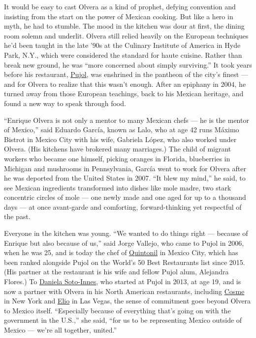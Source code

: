It would be easy to cast Olvera as a kind of prophet, defying convention
and insisting from the start on the power of Mexican cooking. But like a
hero in myth, he had to stumble. The mood in the kitchen was dour at
first, the dining room solemn and underlit. Olvera still relied heavily
on the European techniques he'd been taught in the late '90s at the
Culinary Institute of America in Hyde Park, N.Y., which were considered
the standard for haute cuisine. Rather than break new ground, he was
``more concerned about simply surviving.'' It took years before his
restaurant, \href{https://pujol.com.mx/en/}{Pujol}, was enshrined in the
pantheon of the city's finest --- and for Olvera to realize that this
wasn't enough. After an epiphany in 2004, he turned away from those
European teachings, back to his Mexican heritage, and found a new way to
speak through food.

``Enrique Olvera is not only a mentor to many Mexican chefs --- he is
the mentor of Mexico,'' said Eduardo García, known as Lalo, who at age
42 runs Máximo Bistrot in Mexico City with his wife, Gabriela López, who
also worked under Olvera. (His kitchens have brokered many marriages.)
The child of migrant workers who became one himself, picking oranges in
Florida, blueberries in Michigan and mushrooms in Pennsylvania, García
went to work for Olvera after he was deported from the United States in
2007. ``It blew my mind,'' he said, to see Mexican ingredients
transformed into dishes like mole madre, two stark concentric circles of
mole --- one newly made and one aged for up to a thousand days --- at
once avant-garde and comforting, forward-thinking yet respectful of the
past.

Everyone in the kitchen was young. ``We wanted to do things right ---
because of Enrique but also because of us,'' said Jorge Vallejo, who
came to Pujol in 2006, when he was 25, and is today the chef of
\href{https://quintonil.com/en/restaurant-quintonil/}{Quintonil} in
Mexico City, which has been ranked alongside Pujol on the World's 50
Best Restaurants list since 2015. (His partner at the restaurant is his
wife and fellow Pujol alum, Alejandra Flores.) To
\href{https://www.nytimes.com/2019/01/02/t-magazine/daniela-soto-innes-recipes-wellness.html}{Daniela
Soto-Innes}, who started at Pujol in 2013, at age 19, and is now a
partner with Olvera in his North American restaurants, including
\href{https://www.cosmenyc.com/}{Cosme} in New York and
\href{https://eliolv.com/}{Elio} in Las Vegas, the sense of commitment
goes beyond Olvera to Mexico itself. ``Especially because of everything
that's going on with the government in the U.S.,'' she said, ``for us to
be representing Mexico outside of Mexico --- we're all together,
united.''

